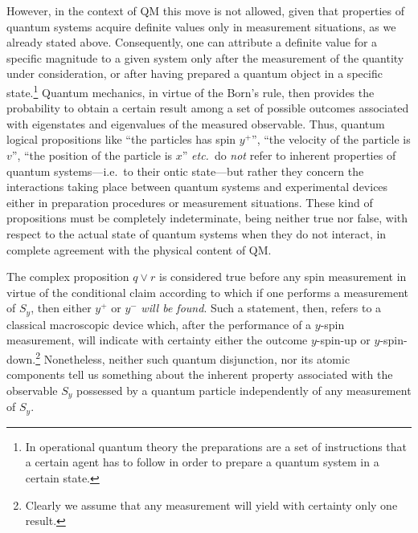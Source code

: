 \documentclass[11pt, executivepaper]{article}
\begin{document}
However, in the context of QM this move is not allowed, given that properties of quantum systems acquire definite values only in measurement situations, as we already stated above. Consequently, one can attribute a definite value for a specific magnitude to a given system only after the measurement of the quantity under consideration, or after having prepared a quantum object in a specific state.\footnote{In operational quantum theory the preparations are a set of instructions that a certain agent has to follow in order to prepare a quantum system in a certain state.} Quantum mechanics, in virtue of the Born's rule, then provides the probability to obtain a certain result among a set of possible outcomes associated with eigenstates and eigenvalues of the measured observable. Thus, quantum logical propositions like ``the particles has spin $y^+$'', ``the velocity of the particle is $v$'', ``the position of the particle is $x$'' \emph{etc.}\ do \emph{not} refer to inherent properties of quantum systems---i.e.\ to their ontic state---but rather they concern the interactions taking place between quantum systems and experimental devices either in preparation procedures or measurement situations. These kind of propositions must be completely indeterminate, being neither true nor false, with respect to the actual state of quantum systems when they do not interact, in complete agreement with the physical content of QM. 

The complex proposition $q \vee r$ is considered true before any spin measurement in virtue of the conditional claim according to which if one performs a measurement of $S_y$, then either $y^+$ or $y^-$ \emph{will be found}. Such a statement, then, refers to a classical macroscopic device which, after the performance of a $y$-spin measurement, will indicate with certainty either the outcome $y$-spin-up or $y$-spin-down.\footnote{Clearly we assume that any measurement will yield with certainty only one result.} Nonetheless, neither such quantum disjunction, nor its atomic components tell us something about the inherent property associated with the observable $S_y$ possessed by a quantum particle independently of any measurement of $S_y$. 
\end{document}
